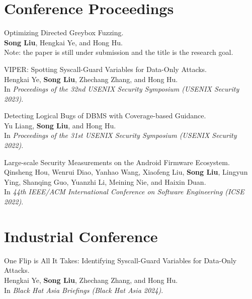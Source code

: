 \documentclass[letterpaper,10pt]{article}
\newcommand{\shorterSection}[1]{\vspace{-10pt}\section{#1}}
\begin{document}
\shorterSection{\textcolor{titleblue}{Conference Proceedings}}
  \begin{enumerate}[label={[\arabic*]}]

    \item Optimizing Directed Greybox Fuzzing. \\
          \textbf{Song Liu}, Hengkai Ye, and Hong Hu. \\
          Note: the paper is still under submission and the title is the research goal.

    \item VIPER: Spotting Syscall-Guard Variables for Data-Only Attacks. \\
          Hengkai Ye, \textbf{Song Liu}, Zhechang Zhang, and Hong Hu. \\
          In \textit{Proceedings of the 32nd USENIX Security Symposium (USENIX Security 2023)}.

      
    \item Detecting Logical Bugs of DBMS with Coverage-based Guidance. \\
          Yu Liang, \textbf{Song Liu}, and Hong Hu. \\
          In \textit{Proceedings of the 31st USENIX Security Symposium (USENIX Security 2022)}.

    \item Large-scale Security Measurements on the Android Firmware Ecosystem. \\
          Qinsheng Hou, Wenrui Diao, Yanhao Wang, Xiaofeng Liu, \textbf{Song Liu}, Lingyun Ying, Shanqing Guo, Yuanzhi Li, Meining Nie, and Haixin Duan. \\
          In \textit{44th IEEE/ACM International Conference on Software Engineering (ICSE 2022)}.

  \end{enumerate}

\shorterSection{\textcolor{titleblue}{Industrial Conference}}
  \begin{enumerate}[label={[\arabic*]}]
    \item One Flip is All It Takes: Identifying Syscall-Guard Variables for Data-Only Attacks. \\
          Hengkai Ye, \textbf{Song Liu}, Zhechang Zhang, and Hong Hu. \\
          In \textit{Black Hat Asia Briefings (Black Hat Asia 2024)}.
  \end{enumerate}
\end{document}
